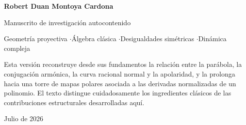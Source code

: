 \documentclass[11pt,oneside]{scrartcl}
\theoremstyle{plainblue}
\theoremstyle{definitionblue}
\theoremstyle{remarkgray}
\begin{document}
\begin{titlepage}
\vspace{4.45cm}
\begin{center}
{\Large\sffamily\bfseries\color{Navy} Robert Duan Montoya Cardona}\par
\vspace{0.35cm}
{\large\sffamily\color{Slate} Manuscrito de investigación autocontenido}\par
\vspace{0.15cm}
{\sffamily\color{Slate} Geometría proyectiva \enspace$\cdot$\enspace Álgebra clásica \enspace$\cdot$\enspace Desigualdades simétricas \enspace$\cdot$\enspace Dinámica compleja}\par
\vfill
\begin{minipage}{0.82\textwidth}
\centering\small\color{DarkGray}
Esta versión reconstruye desde sus fundamentos la relación entre la parábola, la
conjugación armónica, la curva racional normal y la apolaridad, y la prolonga hacia
una torre de mapas polares asociada a las derivadas normalizadas de un polinomio.
El texto distingue cuidadosamente los ingredientes clásicos de las contribuciones
estructurales desarrolladas aquí.
\end{minipage}\par
\vspace{0.75cm}
{\sffamily\color{Slate} Julio de 2026\par}
\end{center}
\end{titlepage}
\hypersetup{pageanchor=true}

\end{document}
